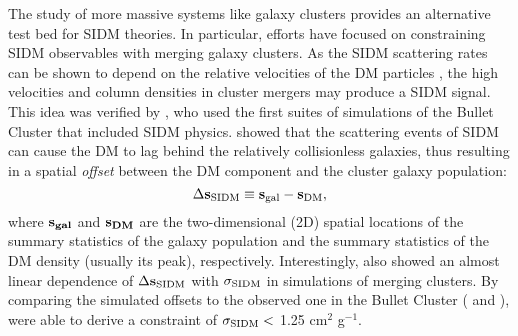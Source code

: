 \documentclass[usenatbib]{mn2e}
\newcommand{\sigmaSIDM}{\sigma_{\rm SIDM}}
\newcommand{\offset}{\Delta {\bf s}}
\newcommand{\SIDM}{{\rm SIDM}}
\begin{document}
The study of more massive systems like galaxy clusters provides an alternative test bed for SIDM theories.
In particular, efforts have focused on constraining SIDM observables with merging galaxy clusters.
As the SIDM scattering rates can be shown to depend on the 
relative velocities of the DM particles \citep{Markevitch2004}, the high
velocities and column densities in cluster mergers may produce a SIDM signal. This idea was verified by 
\cite{Randall2008d}, who used the first suites of simulations of the
Bullet Cluster that included SIDM physics. \cite{Randall2008d} showed that the scattering events of SIDM can cause the DM
to lag behind the relatively collisionless galaxies, thus resulting in a spatial {\it offset} between the DM component and the cluster galaxy population:
\begin{equation}
	\offset_{\SIDM} \equiv {\bf s}_{\rm gal} - {\bf s}_{\rm DM},
	\label{eq:offset}
\end{equation}
where $\bf{s}_{gal}$ and $\bf{s}_{DM}$ are the two-dimensional (2D) spatial
locations of the summary statistics of the galaxy population and the summary statistics of the DM density (usually its peak), respectively. 
Interestingly, \cite{Randall2008d} also showed an almost linear dependence of
$\offset_{\SIDM}$ with $\sigmaSIDM$ in simulations of merging clusters.
By comparing the simulated offsets to the observed one in the Bullet Cluster (\citealt[25 $\pm$ 29 kpc][]{Markevitch2004} and \citealt{Bradac2006b}),
\cite{Randall2008d} were able to derive a constraint of $\sigmaSIDM <$ 
1.25 cm$^2$ g$^{-1}$.  \\
\end{document}
